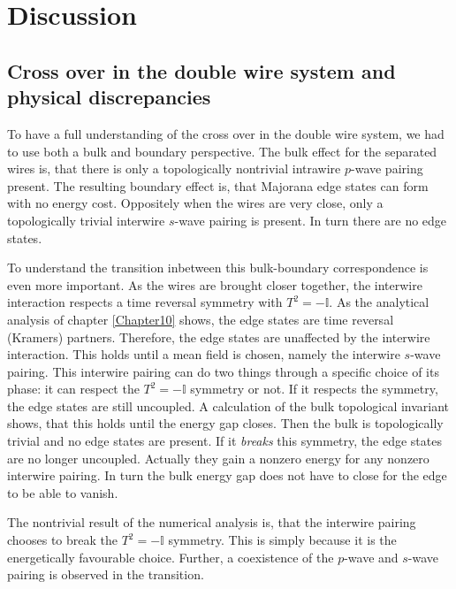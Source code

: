 \chapter{Discussion} 

\label{Chapter13} 

\section{Cross over in the double wire system and physical discrepancies} \label{sec.Discussion.2wires.crossover}
To have a full understanding of the cross over in the double wire system, we had to use both a bulk and boundary perspective. The bulk effect for the separated wires is, that there is only a topologically nontrivial intrawire $p$-wave pairing present. The resulting boundary effect is, that Majorana edge states can form with no energy cost. Oppositely when the wires are very close, only a topologically trivial interwire $s$-wave pairing is present. In turn there are no edge states. 

To understand the transition inbetween this bulk-boundary correspondence is even more important. As the wires are brought closer together, the interwire interaction respects a time reversal symmetry with $T^2 = - \mathbb{I}$. As the analytical analysis of chapter \ref{Chapter10} shows, the edge states are time reversal (Kramers) partners. Therefore, the edge states are unaffected by the interwire interaction. This holds until a mean field is chosen, namely the interwire $s$-wave pairing. This interwire pairing can do two things through a specific choice of its phase: it can respect the $T^2 = - \mathbb{I}$ symmetry or not. If it respects the symmetry, the edge states are still uncoupled. A calculation of the bulk topological invariant shows, that this holds until the energy gap closes. Then the bulk is topologically trivial and no edge states are present. If it \textit{breaks} this symmetry, the edge states are no longer uncoupled. Actually they gain a nonzero energy for any nonzero interwire pairing. In turn the bulk energy gap does not have to close for the edge to be able to vanish. 

The nontrivial result of the numerical analysis is, that the interwire pairing chooses to break the $T^2 = -\mathbb{I}$ symmetry. This is simply because it is the energetically favourable choice. Further, a coexistence of the $p$-wave and $s$-wave pairing is observed in the transition. 

